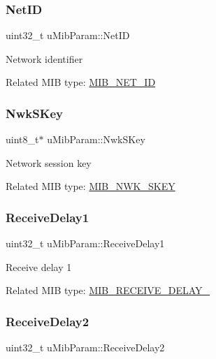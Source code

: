 \subsubsection{\texorpdfstring{Net\+ID}{NetID}}
{\footnotesize\ttfamily uint32\+\_\+t u\+Mib\+Param\+::\+Net\+ID}

Network identifier

Related M\+IB type\+: \hyperlink{group__LORAMAC_gga32ea83d13a3f5bb4b3ec2ace2319ab61a982c4b7cc1e276633134aa89298c96b0}{M\+I\+B\+\_\+\+N\+E\+T\+\_\+\+ID} \mbox{\label{unionuMibParam_a64c3f5e98c8558eedbd7fe42dfcd160e}} 
\subsubsection{\texorpdfstring{Nwk\+S\+Key}{NwkSKey}}
{\footnotesize\ttfamily uint8\+\_\+t$\ast$ u\+Mib\+Param\+::\+Nwk\+S\+Key}

Network session key

Related M\+IB type\+: \hyperlink{group__LORAMAC_gga32ea83d13a3f5bb4b3ec2ace2319ab61a60d7688e714c9b140648aadd2e7ab36e}{M\+I\+B\+\_\+\+N\+W\+K\+\_\+\+S\+K\+EY} \mbox{\label{unionuMibParam_af36e0cb0f6077bf16d18e0563725eef4}} 
\subsubsection{\texorpdfstring{Receive\+Delay1}{ReceiveDelay1}}
{\footnotesize\ttfamily uint32\+\_\+t u\+Mib\+Param\+::\+Receive\+Delay1}

Receive delay 1

Related M\+IB type\+: \hyperlink{group__LORAMAC_gga32ea83d13a3f5bb4b3ec2ace2319ab61aa3511cfca5a46654d97b022d50c82ae8}{M\+I\+B\+\_\+\+R\+E\+C\+E\+I\+V\+E\+\_\+\+D\+E\+L\+A\+Y\+\_} \mbox{\label{unionuMibParam_a8606ae0bf9c205d3cebb622986d1d291}} 
\subsubsection{\texorpdfstring{Receive\+Delay2}{ReceiveDelay2}}
{\footnotesize\ttfamily uint32\+\_\+t u\+Mib\+Param\+::\+Receive\+Delay2}

